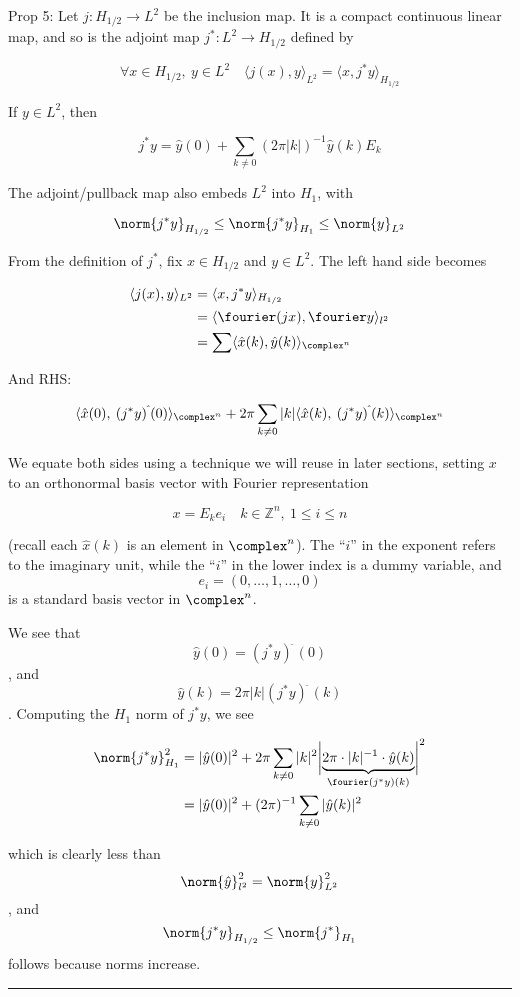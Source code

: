 Prop 5: Let \(j: H_{1/2}\to L^2\) be the inclusion map. It is a compact
continuous linear map, and so is the adjoint map \(j^*: L^2\to H_{1/2}\)
defined by

\[
\forall x\in H_{1/2},\: y\in L^2\quad \langle j(x),y\rangle_{L^2} = \langle x,j^*y\rangle_{H_{1/2}}
\]

If \(y\in L^2\), then

\[
j^*y = \hat{y}(0) + \sum_{k\neq 0}(2\pi\vert k\vert)^{-1}\hat{y}(k)E_k
\]

The adjoint/pullback map also embeds \(L^2\) into \(H_1\), with

\[
\norm{j^*y}_{H_{1/2}}\leq \norm{j^*y}_{H_1}\leq \norm{y}_{L^2}
\]

From the definition of \(j^*\), fix \(x\in H_{1/2}\) and \(y\in L^2\).
The left hand side becomes

\[
\begin{align}
\langle j(x), y\rangle_{L^2} &= \langle x,j^*y\rangle_{H_{1/2}} \\
&= \langle \fourier(jx),\fourier y\rangle_{l^2}\\
&= \sum \langle \hat{x}(k),\hat{y}(k)\rangle_{\complex^n}
\end{align}
\]

And RHS:

\[
\langle \hat{x}(0),\:(j^*y)^{\hat{\:}}(0)\rangle_{\complex^n} + 2\pi\sum_{k\neq 0}\vert k\vert\langle \hat{x}(k),\: (j^*y)^{\hat{\:}}(k)\rangle_{\complex^n}
\]

We equate both sides using a technique we will reuse in later sections,
setting \(x\) to an orthonormal basis vector with Fourier representation

\[
x = E_ke_i\quad k\in\mathbb{Z}^n,\: 1\leq i\leq n
\]

(recall each \(\hat{x}(k)\) is an element in \(\complex^n\)). The
``\(i\)'' in the exponent refers to the imaginary unit, while the
``\(i\)'' in the lower index is a dummy variable, and
\[e_i = (0,\ldots,1,\ldots,0)\] is a standard basis vector in
\(\complex^n\).

We see that \[\hat{y}(0) = (j^*y)^{\hat{\:}}(0)\], and
\[\hat{y}(k)=2\pi \vert k\vert (j^*y)^{\hat{\:}}(k)\]. Computing the
\(H_{1}\) norm of \(j^*y\), we see

\[
\begin{align}
\norm{j^*y}^2_{H_{1}} &= \vert \hat{y}(0)\vert^2 + 2\pi\sum_{k\neq 0}\vert k\vert^2\biggl\vert \underbrace{2\pi\cdot\vert k\vert^{-1}\cdot\hat{y}(k)}_{\fourier(j^*y)(k)}\biggr\vert^2\\
&= \vert \hat{y}(0)\vert^2 + (2\pi)^{-1}\sum_{k\neq 0}\vert \hat{y}(k)\vert^2
\end{align}
\]

which is clearly less than
\[\norm{\hat{y}}^2_{l^2} = \norm{y}^2_{L^2}\], and
\[\norm{j^*y}_{H_{1/2}}\leq \norm{j^*}_{H_1}\] follows because norms
increase.

\begin{center}\rule{0.5\linewidth}{0.5pt}\end{center}
